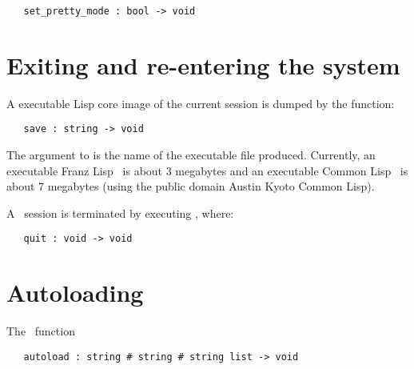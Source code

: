 \begin{boxed}
\begin{verbatim}
   set_pretty_mode : bool -> void
\end{verbatim}\end{boxed}

\section{Exiting and re-entering the system}

A executable Lisp core
 image of the current session is dumped by the function:

\begin{boxed}
\begin{verbatim}
   save : string -> void
\end{verbatim}\end{boxed}

\noindent The argument to  is the name of the executable 
file produced.  Currently,
an executable Franz Lisp
 \HOL\ is about 3 megabytes and an 
executable Common Lisp
\HOL\ is about 7 megabytes (using the public domain Austin Kyoto Common Lisp).

A \HOL\ session is terminated
by executing , where:

\begin{boxed}
\begin{verbatim}
   quit : void -> void
\end{verbatim}\end{boxed}

\section{Autoloading}

The \ML\ function

\begin{boxed}
\begin{verbatim}
   autoload : string # string # string list -> void
\end{verbatim}\end{boxed}

